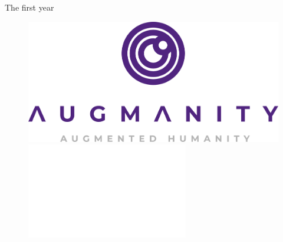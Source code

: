 \begin{frame}{The first year}
    \begin{figure}
        \begin{minipage}[t]{0.30\linewidth}
            \centering
            \vspace{0pt}
            \includegraphics[width=\textwidth]{img/student_grant.png}
        \end{minipage}
        \hspace{0.5cm}
        \begin{minipage}[t]{0.50\linewidth}
            \centering
            \vspace{47pt}
            \includegraphics[width=\textwidth]{img/white_space.png}
        \end{minipage}
    \end{figure}
\end{frame}
